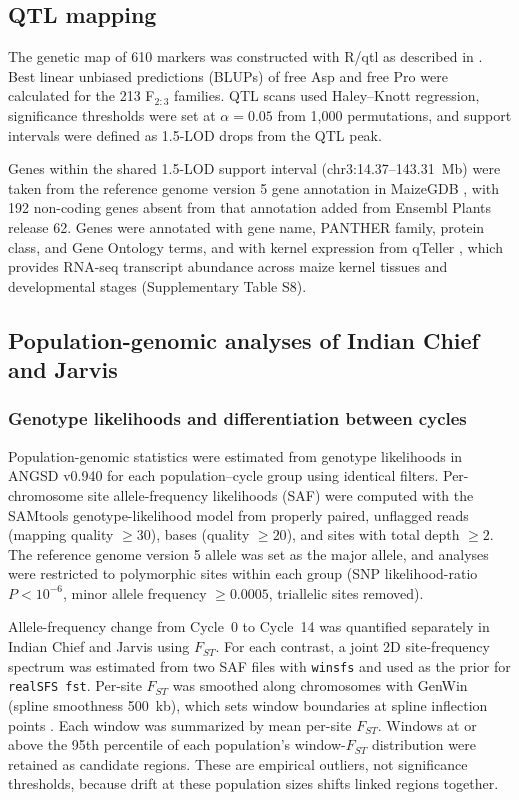 \subsection{QTL mapping}
The genetic map of 610 markers was constructed with R/qtl \citep{Broman2003} as described in \citet{Fitzsimmons2026KernelKitchen}. Best linear unbiased predictions (BLUPs) of free Asp and free Pro were calculated for the 213 F$_{2:3}$ families. QTL scans used Haley--Knott regression, significance thresholds were set at $\alpha = 0.05$ from 1,000 permutations, and support intervals were defined as 1.5-LOD drops from the QTL peak.

Genes within the shared 1.5-LOD support interval (chr3:14.37--143.31~Mb) were taken from the reference genome version 5 gene annotation in MaizeGDB \citep{MaizeGDB}, with 192 non-coding genes absent from that annotation added from Ensembl Plants release 62. Genes were annotated with gene name, PANTHER family, protein class, and Gene Ontology terms, and with kernel expression from qTeller \citep{qteller}, which provides RNA-seq transcript abundance across maize kernel tissues and developmental stages (Supplementary Table S8).

\subsection{Population-genomic analyses of Indian Chief and Jarvis}

\subsubsection{Genotype likelihoods and differentiation between cycles}

Population-genomic statistics were estimated from genotype likelihoods in ANGSD v0.940 \citep{Korneliussen2014ANGSD} for each population–cycle group using identical filters. Per-chromosome site allele-frequency likelihoods (SAF) were computed with the SAMtools genotype-likelihood model from properly paired, unflagged reads (mapping quality $\ge 30$), bases (quality $\ge 20$), and sites with total depth $\ge 2$. The reference genome version 5 allele was set as the major allele, and analyses were restricted to polymorphic sites within each group (SNP likelihood-ratio $P < 10^{-6}$, minor allele frequency $\ge 0.0005$, triallelic sites removed).

Allele-frequency change from Cycle~0 to Cycle~14 was quantified separately in Indian Chief and Jarvis using $F_{ST}$. For each contrast, a joint 2D site-frequency spectrum was estimated from two SAF files with \texttt{winsfs} \citep{Rasmussen2022winsfs} and used as the prior for \texttt{realSFS fst}. Per-site $F_{ST}$ was smoothed along chromosomes with GenWin (spline smoothness 500~kb), which sets window boundaries at spline inflection points \citep{Beissinger2015GenWin}. Each window was summarized by mean per-site $F_{ST}$. Windows at or above the 95th percentile of each population’s window-$F_{ST}$ distribution were retained as candidate regions. These are empirical outliers, not significance thresholds, because drift at these population sizes shifts linked regions together.

